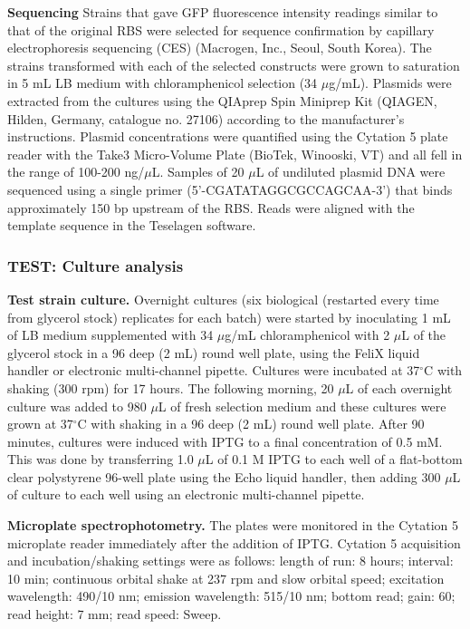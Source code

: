 \textbf{Sequencing}
Strains that gave GFP fluorescence intensity readings similar to that of the original RBS were selected for sequence confirmation by capillary electrophoresis sequencing (CES) (Macrogen, Inc., Seoul, South Korea).
The strains transformed with each of the selected constructs were grown to saturation in 5 mL LB medium with chloramphenicol selection (34 $\mu$g/mL).
Plasmids were extracted from the cultures using the QIAprep Spin Miniprep Kit (QIAGEN, Hilden, Germany, catalogue no. 27106) according to the manufacturer's instructions.
Plasmid concentrations were quantified using the Cytation 5 plate reader with the Take3 Micro-Volume Plate (BioTek, Winooski, VT) and all fell in the range of 100-200 ng/$\mu$L.
Samples of 20 $\mu$L of undiluted plasmid DNA were sequenced using a single primer (5'-CGATATAGGCGCCAGCAA-3') that binds approximately 150 bp upstream of the RBS.
Reads were aligned with the template sequence in the Teselagen software.

\subsubsection{TEST: Culture analysis}

\textbf{Test strain culture.}
Overnight cultures (six biological (restarted every time from glycerol stock) replicates for each batch) were started by inoculating 1 mL of LB medium supplemented with 34 $\mu$g/mL chloramphenicol with 2 $\mu$L of the glycerol stock in a 96 deep (2 mL) round well plate, using the FeliX liquid handler or electronic multi-channel pipette.
Cultures were incubated at 37$^{\circ}$C with shaking (300 rpm) for 17 hours. 
The following morning, 20 $\mu$L of each overnight culture was added to 980 $\mu$L of fresh selection medium and these cultures were grown at 37$^{\circ}$C with shaking in a 96 deep (2 mL) round well plate. 
After 90 minutes, cultures were induced with IPTG to a final concentration of 0.5 mM. This was done by transferring 1.0 $\mu$L of 0.1 M IPTG to each well of a flat-bottom clear polystyrene 96-well plate using the Echo liquid handler, then adding 300 $\mu$L of culture to each well using an electronic multi-channel pipette.


\textbf{Microplate spectrophotometry.}
The plates were monitored in the Cytation 5 microplate reader immediately after the addition of IPTG.
Cytation 5 acquisition and incubation/shaking settings were as follows: length of run: 8 hours; interval: 10 min; continuous orbital shake at 237 rpm and slow orbital speed; excitation wavelength: 490/10 nm; emission wavelength: 515/10 nm; bottom read; gain: 60; read height: 7 mm; read speed: Sweep.

